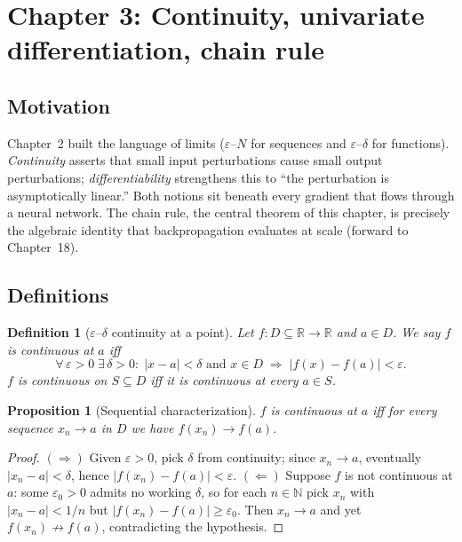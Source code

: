 \documentclass[11pt]{article}
\newtheorem{definition}[theorem]{Definition}
\newtheorem{proposition}[theorem]{Proposition}
\theoremstyle{remark}
\begin{document}

\section*{Chapter 3: Continuity, univariate differentiation, chain rule}

\subsection*{Motivation}

Chapter~2 built the language of limits ($\varepsilon$--$N$ for sequences and $\varepsilon$--$\delta$ for functions). \emph{Continuity} asserts that small input perturbations cause small output perturbations; \emph{differentiability} strengthens this to ``the perturbation is asymptotically linear.'' Both notions sit beneath every gradient that flows through a neural network. The chain rule, the central theorem of this chapter, is precisely the algebraic identity that backpropagation evaluates at scale (forward to Chapter~18).

\subsection*{Definitions}

\begin{definition}[$\varepsilon$--$\delta$ continuity at a point]
Let $f:D\subseteq\mathbb{R}\to\mathbb{R}$ and $a\in D$. We say $f$ is \emph{continuous at $a$} iff
\[
\forall\,\varepsilon>0\;\exists\,\delta>0:\;|x-a|<\delta\text{ and }x\in D\;\Longrightarrow\;|f(x)-f(a)|<\varepsilon.
\]
$f$ is \emph{continuous on $S\subseteq D$} iff it is continuous at every $a\in S$.
\end{definition}

\begin{proposition}[Sequential characterization]\label{prop:seq}
$f$ is continuous at $a$ iff for every sequence $x_n\to a$ in $D$ we have $f(x_n)\to f(a)$.
\end{proposition}

\begin{proof}
$(\Rightarrow)$ Given $\varepsilon>0$, pick $\delta$ from continuity; since $x_n\to a$, eventually $|x_n-a|<\delta$, hence $|f(x_n)-f(a)|<\varepsilon$. $(\Leftarrow)$ Suppose $f$ is not continuous at $a$: some $\varepsilon_0>0$ admits no working $\delta$, so for each $n\in\mathbb{N}$ pick $x_n$ with $|x_n-a|<1/n$ but $|f(x_n)-f(a)|\ge\varepsilon_0$. Then $x_n\to a$ and yet $f(x_n)\not\to f(a)$, contradicting the hypothesis.
\end{proof}
\end{document}
